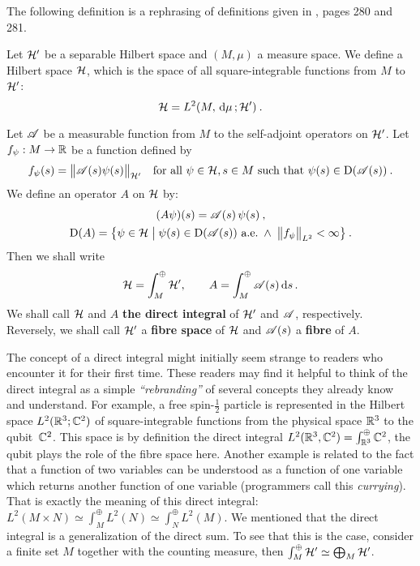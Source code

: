 The following definition is a rephrasing of definitions given in \citet{ReedSimon4}, pages 280 and 281.
\begin{defn}
    \label{defn-direct-integral}
    Let $\mathcal{H}'$ be a separable Hilbert space and $(M, \mu)$ a measure space. We define a Hilbert space $\mathcal{H}$, which is the space of all square-integrable functions from $M$ to $\mathcal{H}'$:
    \begin{equation*}
        \mathcal{H} = L^2(M, \, \mathrm{d}\mu \,; \mathcal{H}') \: .
    \end{equation*}

    Let $\mathscr{A}$ be a measurable function from $M$ to the self-adjoint operators on $\mathcal{H}'$. Let $f_\psi: M \to \mathbb{R}$ be a function defined by
    \begin{align*}
        f_\psi(s) = \big\lVert \mathscr{A}(s) \psi(s) \big\rVert_{\mathcal{H}'}
        \quad
        \text{for all } \psi \in \mathcal{H}, s \in M \text{ such that } \psi(s) \in \mathrm{D}(\mathscr{A}(s)) \: .
    \end{align*}
    We define an operator $A$ on $\mathcal{H}$ by:
    \begin{gather*}
        (A \psi)(s) = \mathscr{A}(s) \, \psi(s) \: , \\
        \mathrm{D}(A) = \big\{
            \psi \in \mathcal{H}
            \; \big| \;
            \psi(s) \in \mathrm{D}(\mathscr{A}(s)) \text{ a.e.}
            \; \wedge \;
            \big\lVert f_\psi \big\rVert_{L^2} < \infty
        \big\} \: .
    \end{gather*}
    Then we shall write
    \begin{gather*}
        \mathcal{H} = \int^\oplus_M \mathcal{H}', \qquad
        A = \int^\oplus_M \mathscr{A}(s) \, \mathrm{d}s \,.
    \end{gather*}
    We shall call $\mathcal{H}$ and $A$ \textbf{the direct integral} of $\mathcal{H}'$ and $\mathscr{A}$, respectively. Reversely, we shall call $\mathcal{H}'$ a \textbf{fibre space} of $\mathcal{H}$ and $\mathscr{A}(s)$ a \textbf{fibre} of $A$.
\end{defn}

The concept of a direct integral might initially seem strange to readers who encounter it for their first time. These readers may find it helpful to think of the direct integral as a simple \textit{“rebranding”} of several concepts they already know and understand. For example, a free spin-$\frac{1}{2}$ particle is represented in the Hilbert space $L^2(\mathbb{R}^3; \mathbb{C}^2)$ of square-integrable functions from the physical space $\mathbb{R}^3$ to the qubit~$\mathbb{C}^2$. This space is by definition the direct integral $L^2(\mathbb{R}^3, \mathbb{C}^2) = \int_{\mathbb{R}^3}^\oplus \mathbb{C}^2$, the qubit plays the role of the fibre space here. Another example is related to the fact that a function of two variables can be understood as a function of one variable which returns another function of one variable (programmers call this \textit{currying}). That is exactly the meaning of this direct integral: $L^2(M\times N) \simeq \int_M^\oplus L^2(N) \simeq \int_N^\oplus L^2(M)$. We mentioned that the direct integral is a generalization of the direct sum. To see that this is the case, consider a finite set $M$ together with the counting measure, then $\int^\oplus_M \mathcal{H}' \simeq \bigoplus_{M} \mathcal{H}'$.

